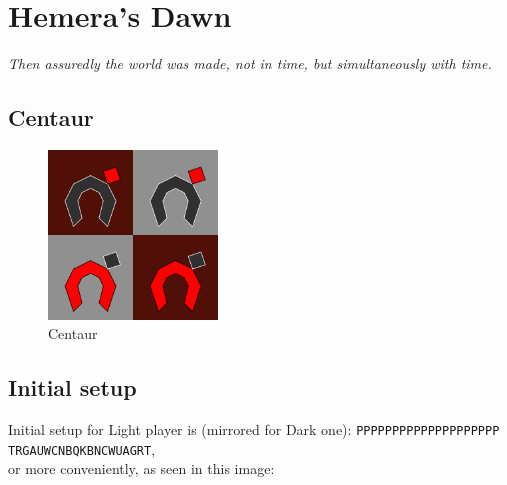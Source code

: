 \documentclass[a5paper,12pt,draft]{book} %
\begin{document}
\clearpage

\chapter*{Hemera's Dawn}

\begin{flushright}
\parbox{0.8\textwidth}{
\emph{Then assuredly the world was made, not in time, but simultaneously with time. \\
 } }
\end{flushright}

\section*{Centaur}

\noindent
\begin{figure}
\includegraphics[width=0.4\textwidth, keepaspectratio=true]{../gfx/pieces/12_centaur.png}
\caption{Centaur}
\label{fig:centaur}
\end{figure}

\clearpage

\section*{Initial setup}

Initial setup for Light player is (mirrored for Dark one):
\texttt{PPPPPPPPPPPPPPPPPPPP \\
        TRGAUWCNBQKBNCWUAGRT}, \\
or more conveniently, as seen in this image:
\end{document}
